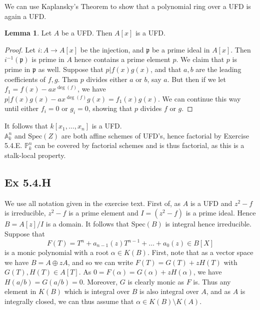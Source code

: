 \documentclass{article}
\theoremstyle{definition}
\newtheorem{lemma}[theorem]{Lemma}
\renewcommand{\P}{\mathbb{P}}
\newcommand{\A}{\mathbb{A}}
\newcommand{\Spec}{\text{Spec}}
\begin{document}
We can use Kaplansky's Theorem to show that a polynomial ring over a UFD
is again a UFD.

\begin{lemma}
	Let $A$ be a UFD. Then $A[x]$ is a UFD.
\end{lemma}
\begin{proof}
	Let $i : A \to A[x]$ be the injection, and $\mathfrak{p}$ be a prime ideal
	in $A[x]$. Then $i^{-1}(\mathfrak{p})$ is prime in $A$ hence contains a
	prime element $p$. We claim that $p$ is prime in $\mathfrak{p}$ as well.
	Suppose that $p | f(x)g(x)$, and that $a, b$ are the leading coefficients
	of $f, g$. Then $p$ divides either $a$ or $b$, say $a$. But then if we let
	$f_1 = f(x) - ax^{\deg(f)}$, we have $p | f(x)g(x) - ax^{\deg(f)}g(x) =
		f_1(x)g(x)$. We can continue this way until either $f_i = 0$ or $g_i = 0$,
	showing that $p$ divides $f$ or $g$.
\end{proof}

It follows that $k[x_1, \ldots, x_n]$ is a UFD. \\

$\A^{n}_{k}$ and $\Spec(Z)$ are both affine schemes of UFD's, hence factorial
by Exercise 5.4.E. $\P^{n}_k$ can be covered by factorial schemes and is thus
factorial, as this is a stalk-local property.

\subsection*{Ex 5.4.H}

We use all notation given in the exercise text. First of, as $A$ is a UFD and
$z^2 - f$ is irreducible, $z^2 - f$ is a prime element and $I = (z^2 - f)$ is a
prime ideal. Hence $B = A[z]/I$ is a domain. It follows that $\Spec(B)$ is
integral hence irreducible. \\

Suppose that
\[
	F(T)
	=
	T^{n}
	+
	a_{n - 1}(z) T^{n - 1}
	+
	\ldots
	+
	a_0(z)
	\in B[X]
\]
is a monic polynomial with a root $\alpha \in K(B)$. First, note that as a
vector space we have $B = A \oplus z A$, and so we can write $F(T) = G(T) + z
	H(T)$ with $G(T), H(T) \in A[T]$. As $0 = F(\alpha) = G(\alpha) + z H(\alpha)$,
we have $H(a/b) = G(a/b) = 0$. Moreover, $G$ is clearly monic as $F$ is. Thus
any element in $K(B)$ which is integral over $B$ is also integral over $A$, and
as $A$ is integrally closed, we can thus assume that $\alpha \in K(B) \setminus
	K(A)$. \\
\end{document}
